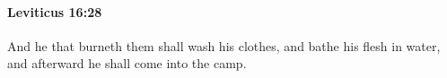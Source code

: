 
		\paragraph{Leviticus 16:28} %
			\label{LEVITICUS-16-28}

			And he that burneth them shall wash his clothes, and bathe his flesh in water, and afterward he shall come into the camp.


